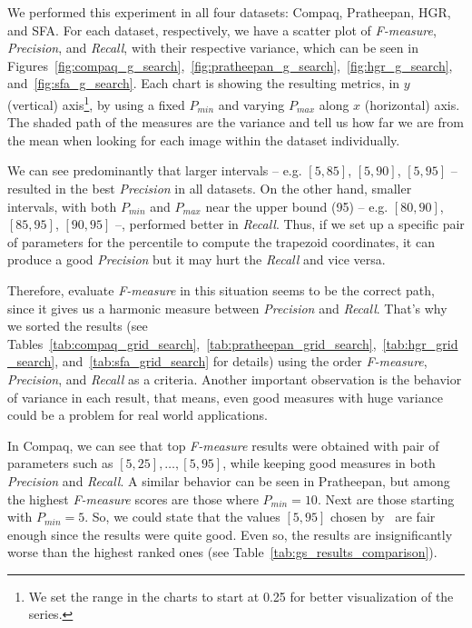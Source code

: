 We performed this experiment in all four datasets: Compaq, Pratheepan, HGR, and SFA. For each dataset, respectively, we have a scatter plot of \emph{F-measure}, \emph{Precision}, and \emph{Recall}, with their respective variance, which can be seen in Figures~\ref{fig:compaq_g_search},~\ref{fig:pratheepan_g_search},~\ref{fig:hgr_g_search}, and~\ref{fig:sfa_g_search}. Each chart is showing the resulting metrics, in $y$ (vertical) axis\footnote{We set the range in the charts to start at 0.25 for better visualization of the series.
}, by using a fixed $P_{min}$ and varying $P_{max}$ along $x$ (horizontal) axis. The shaded path of the measures are the variance and tell us how far we are from the mean when looking for each image within the dataset individually.

We can see predominantly that larger intervals -- e.g. $[5, 85]$, $[5, 90]$, $[5, 95]$ -- resulted in the best \emph{Precision} in all datasets. On the other hand, smaller intervals, with both $P_{min}$ and $P_{max}$ near the upper bound (95) -- e.g. $[80, 90]$, $[85, 95]$, $[90 ,95]$ --, performed better in \emph{Recall}. Thus, if we set up a specific pair of parameters for the percentile to compute the trapezoid coordinates, it can produce a good \emph{Precision} but it may hurt the \emph{Recall} and vice versa.

Therefore, evaluate \emph{F-measure} in this situation seems to be the correct path, since it gives us a harmonic measure between \emph{Precision} and \emph{Recall}. That's why we sorted the results (see Tables~\ref{tab:compaq_grid_search},~\ref{tab:pratheepan_grid_search},~\ref{tab:hgr_grid_search}, and~\ref{tab:sfa_grid_search} for details) using the order \emph{F-measure}, \emph{Precision}, and \emph{Recall} as a criteria. Another important observation is the behavior of variance in each result, that means, even good measures with huge variance could be a problem for real world applications.

In Compaq, we can see that top \emph{F-measure} results were obtained with pair of parameters such as $[5, 25], \ldots, [5, 95]$, while keeping good measures in both \emph{Precision} and \emph{Recall}. A similar behavior can be seen in Pratheepan, but among the highest \emph{F-measure} scores are those where $P_{min} = 10$. Next are those starting with $P_{min} = 5$. So, we could state that the values $[5, 95]$ chosen by~\citet{brancati:17} are fair enough since the results were quite good. Even so, the results are insignificantly worse than the highest ranked ones (see Table~\ref{tab:gs_results_comparison}).

